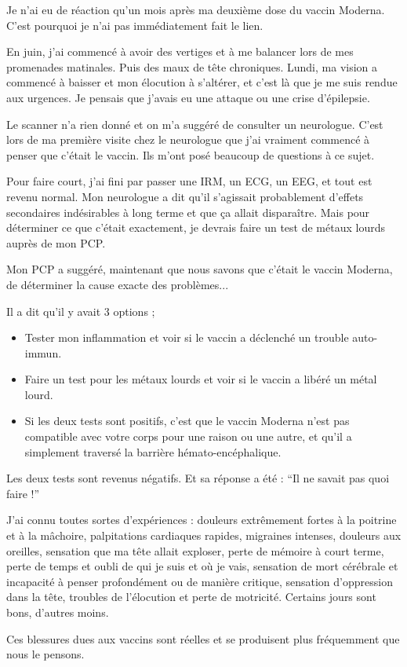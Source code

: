 Je n'ai eu de réaction qu'un mois après ma deuxième dose du vaccin
Moderna. C'est pourquoi je n'ai pas immédiatement fait le lien.

En juin, j'ai commencé à avoir des vertiges et à me balancer lors de mes
promenades matinales. Puis des maux de tête chroniques. Lundi, ma vision a
commencé à baisser et mon élocution à s'altérer, et c'est là que je me suis
rendue aux urgences. Je pensais que j'avais eu une attaque ou une crise
d'épilepsie.

Le scanner n'a rien donné et on m'a suggéré de consulter un neurologue. C'est
lors de ma première visite chez le neurologue que j'ai vraiment commencé à
penser que c'était le vaccin. Ils m'ont posé beaucoup de questions à ce sujet.

Pour faire court, j'ai fini par passer une IRM, un ECG, un EEG, et tout est
revenu normal. Mon neurologue a dit qu'il s'agissait probablement d'effets
secondaires indésirables à long terme et que ça allait disparaître. Mais pour
déterminer ce que c'était exactement, je devrais faire un test de métaux lourds
auprès de mon PCP.

Mon PCP a suggéré, maintenant que nous savons que c'était le vaccin Moderna, de
déterminer la cause exacte des problèmes...

Il a dit qu'il y avait 3 options ;

\begin{itemize}

\item Tester mon inflammation et voir si le vaccin a déclenché un trouble
  auto-immun.

\item Faire un test pour les métaux lourds et voir si le vaccin a libéré un
  métal lourd.

\item Si les deux tests sont positifs, c'est que le vaccin Moderna n'est pas
  compatible avec votre corps pour une raison ou une autre, et qu'il a
  simplement traversé la barrière hémato-encéphalique.

\end{itemize}
  
Les deux tests sont revenus négatifs. Et sa réponse a été : ``Il ne savait pas
quoi faire !''

J'ai connu toutes sortes d'expériences : douleurs extrêmement fortes à la
poitrine et à la mâchoire, palpitations cardiaques rapides, migraines intenses,
douleurs aux oreilles, sensation que ma tête allait exploser, perte de mémoire à
court terme, perte de temps et oubli de qui je suis et où je vais, sensation de
mort cérébrale et incapacité à penser profondément ou de manière critique,
sensation d'oppression dans la tête, troubles de l'élocution et perte de
motricité. Certains jours sont bons, d'autres moins.

Ces blessures dues aux vaccins sont réelles et se produisent plus fréquemment
que nous le pensons.
